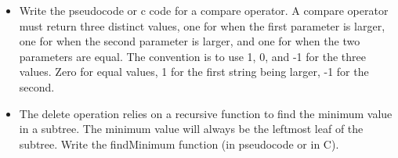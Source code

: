 \begin{itemize}
{	Give the in-order traversal of the tree shown above.
	
	Give the pre-order traversal of the tree.
	}

\item Write the pseudocode or c code for a compare operator. A
compare operator must return three distinct values, one for when the
first parameter is larger, one for when the second parameter is larger,
and one for when the two parameters are equal. The convention is to use
1, 0, and -1 for the three values. Zero for equal values, 1 for the
first string being larger, -1 for the second. 


\item The delete operation relies on a recursive function to
find the minimum value in a subtree. The minimum value will always be
the leftmost leaf of the subtree. Write the findMinimum function (in
pseudocode or in C).

\end{itemize}


